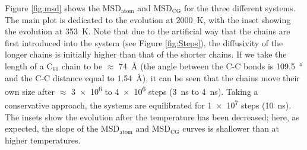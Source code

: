 \documentclass[5p]{elsarticle}
\begin{document}
Figure \ref{fig:msd} shows the $\text{MSD}_{\text{atom}}$ and $\text{MSD}_{\text{CG}}$ for the three different systems. The main plot is dedicated to the evolution at \SI{2000}{\kelvin}, with the inset showing the evolution at \SI{353}{\kelvin}. Note that due to the artificial way that the chains are first introduced into the system (see Figure \ref{fig:Steps}), the diffusivity of the longer chains is initially higher than that of the shorter chains.  If we take the length of a C$_{60}$ chain to be $\approx$ \SI{74}{\angstrom} (the angle between the C-C bonds is \SI{109.5}{\degree} and the C-C distance equal to \SI{1.54}{\angstrom}),  it can be seen that the chains move their own size after $\approx$ \SI{3e6}{} to \SI{4e6}{} steps (\SI{3}{\nano\second} to \SI{4}{\nano\second}). Taking a conservative approach, the systems are equilibrated for \SI{1e7}{} steps (\SI{10}{\nano\second}). The insets show the evolution after the temperature has been decreased; here, as expected, the slope of the $\text{MSD}_{\text{atom}}$ and $\text{MSD}_{\text{CG}}$ curves is shallower than at higher temperatures.
\end{document}
